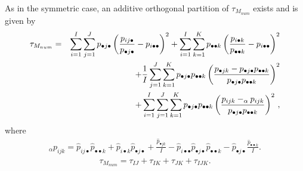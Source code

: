 As in the symmetric case, an additive orthogonal partition of  $\tau_{M_{num}}$  exists and is given by
\begin{eqnarray}
\label{Mp}
\tau_{M_{num}}  & = & \sum_{i=1}^I \sum_{j=1}^J p_{\bullet j \bullet} \left(\frac{p_{ij \bullet}}{p_{\bullet j \bullet}} - p_{i \bullet \bullet} \right)^2 + \sum_{i=1}^I \sum_{k=1}^K p_{\bullet \bullet k} \left(\frac{p_{i \bullet k}}{p_{\bullet \bullet k}} - p_{i \bullet\bullet}\right)^2 \nonumber \\
& & \hspace{10mm} +\frac{1}{I}\sum_{j=1}^J \sum_{k=1}^K p_{\bullet j \bullet} p_{\bullet \bullet k} \left(\frac{p_{\bullet jk} - p_{\bullet j\bullet} p_{\bullet \bullet k}} {p_{\bullet j \bullet} p_{\bullet \bullet k}}\right)^2 \nonumber \\
& & \hspace{20mm} + \sum_{i=1}^I \sum_{j=1}^J \sum_{k=1}^K p_{\bullet j\bullet}p_{\bullet \bullet k} \left(\frac{p_{ijk} - _\alpha p_{ijk}}{p_{\bullet j\bullet}p_{\bullet \bullet k}}\right)^2 \,,
\end{eqnarray}
{
\noindent where
\begin{eqnarray*}
{_{\alpha}p_{ijk}}=\hat{p}_{ij\bullet} \hat{p}_{\bullet \bullet k} + \hat{p}_{i \bullet k} \hat{p}_{\bullet j \bullet} +\frac{\hat{p}_{\bullet jk}}{I} - \hat{p}_{i\bullet \bullet } \hat{p}_{\bullet j\bullet} \hat{p}_{\bullet \bullet k} - \hat{p}_{\bullet j \bullet} \frac{\hat{p}_{\bullet \bullet k}}{I}. \nonumber
\end{eqnarray*}
}
\begin{eqnarray}
\label{taupartition3}
\tau_{M_{num}} = \tau_{IJ} + \tau_{IK} + \tau_{JK} + \tau_{IJK}.
\end{eqnarray}

